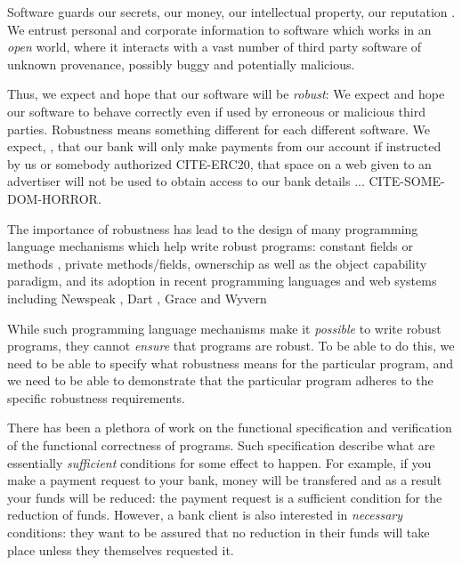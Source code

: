 Software guards our secrets, our money, our intellectual property,
our reputation \cite{covfefe}.  We entrust personal and
corporate information to software which works in an \emph{open} world, 
where  it interacts with a vast number of
third party software of unknown provenance, possibly buggy and potentially malicious.

Thus, we expect and hope that our software will be \emph{robust}:
We expect and hope our software to behave correctly even if  used 
by erroneous or malicious third parties. Robustness means 
something different for each different software.
 We expect, \eg, that our bank will only make payments 
from our account if instructed by us or somebody authorized CITE-ERC20,
that  space on a web given to an advertiser will not be used
to obtain access to our bank details ... CITE-SOME-DOM-HORROR.

The importance of robustness has lead to the design of many programming
language mechanisms which help write robust programs:
constant fields or methods \cite{...}, private methods/fields\cite{...}, ownerschip\cite{...}
as well as the object capability paradigm\cite{millerPhDThesis},
and its adoption in recent programming languages and web systems
\cite{CapJavaHayesAPLAS17,CapNetSocc17Eide,DOCaT14} including Newspeak
\cite{newspeak17}, Dart \cite{dart15}, Grace \cite{grace,graceClasses}
and Wyvern \cite{wyverncapabilities}

While such programming language mechanisms make it \textit{possible} to write robust
programs, they cannot \textit{ensure} that programs are robust. 
To be able to do this, we need to be able to specify what robustness means for the 
particular program, and we need to be able to demonstrate that the particular program 
adheres to the specific robustness requirements.

There has been a plethora of work on the functional specification and verification of the
functional correctness of programs. Such specification describe what are
essentially \emph{sufficient} conditions for some
effect to happen. For example, if you make a payment request to your bank, money will be transfered
and as a result your funds will be reduced: the payment request is a sufficient condition for the
reduction of funds. However, a bank client is also interested in \emph{necessary} conditions:
they want to be assured that no reduction in their funds will take place unless they themselves
requested it.

